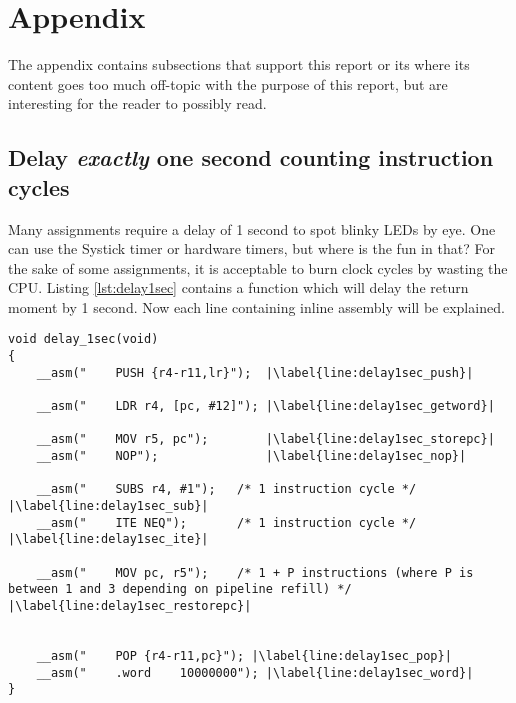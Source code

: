 \section{Appendix}

The appendix contains subsections that support this report or its where its content goes too much off-topic with the purpose of 
this report, but are interesting for the reader to possibly read.

\subsection{Delay \textit{exactly} one second counting instruction cycles}
\label{subsec:appendix_delay}

Many assignments require a delay of 1 second to spot blinky LEDs by eye.
One can use the Systick timer or hardware timers, but where is the fun in that?
For the sake of some assignments, it is acceptable to burn clock cycles by wasting the CPU.
Listing \ref{lst:delay1sec} contains a function which will delay the return moment by 1 second.
Now each line containing inline assembly will be explained.

\begin{lstlisting}[style=CStyle, caption={C function containing inline assembly to perform a delay of \textit{exactly} one second}, captionpos=b, label={lst:delay1sec}, escapechar=|]
void delay_1sec(void)
{
    __asm("    PUSH {r4-r11,lr}");  |\label{line:delay1sec_push}|
 
    __asm("    LDR r4, [pc, #12]"); |\label{line:delay1sec_getword}|
   
    __asm("    MOV r5, pc");        |\label{line:delay1sec_storepc}|
    __asm("    NOP");               |\label{line:delay1sec_nop}|
     
    __asm("    SUBS r4, #1");   /* 1 instruction cycle */ |\label{line:delay1sec_sub}|
    __asm("    ITE NEQ");       /* 1 instruction cycle */ |\label{line:delay1sec_ite}|
   
    __asm("    MOV pc, r5");    /* 1 + P instructions (where P is between 1 and 3 depending on pipeline refill) */ |\label{line:delay1sec_restorepc}|
     
     
    __asm("    POP {r4-r11,pc}"); |\label{line:delay1sec_pop}|
    __asm("    .word    10000000"); |\label{line:delay1sec_word}|
}
\end{lstlisting}

